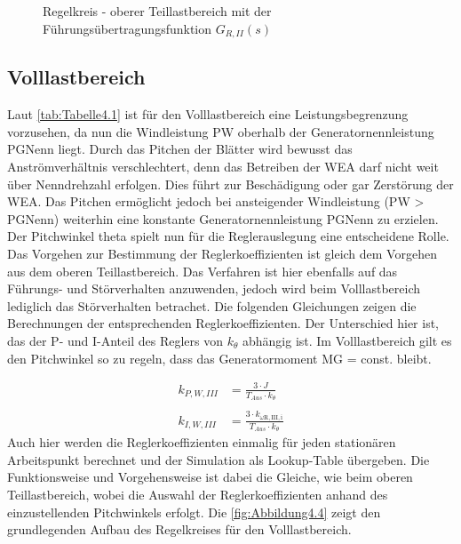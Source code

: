  \begin{figure}[H]
    \centering
    \caption[Reglerkreis - oberer Teillastbereich]{Regelkreis - oberer Teillastbereich mit der Führungsübertragungsfunktion $G_{R,II}(s)$ \cite{SkriptSchulte}}
    \label{fig:Abbildung4.3}
\end{figure}

\subsection{Volllastbereich}
Laut \autoref{tab:Tabelle4.1} ist für den Volllastbereich eine Leistungsbegrenzung vorzusehen, da nun die Windleistung \acs{PW} oberhalb der Generatornennleistung \acs{PGNenn} liegt. Durch das Pitchen der Blätter wird bewusst das Anströmverhältnis verschlechtert, denn das Betreiben der WEA darf nicht weit über Nenndrehzahl erfolgen. Dies führt zur Beschädigung oder gar Zerstörung der WEA. Das Pitchen ermöglicht jedoch bei ansteigender Windleistung (\acs{PW} > \acs{PGNenn}) weiterhin eine konstante Generatornennleistung \acs{PGNenn} zu erzielen. Der Pitchwinkel \acs{theta} spielt nun für die Reglerauslegung eine entscheidene Rolle.\\
Das Vorgehen zur Bestimmung der Reglerkoeffizienten ist gleich dem Vorgehen aus dem oberen Teillastbereich. Das Verfahren ist hier ebenfalls auf das Führungs- und Störverhalten anzuwenden, jedoch wird beim Volllastbereich lediglich das Störverhalten betrachet. Die folgenden Gleichungen zeigen die Berechnungen der entsprechenden Reglerkoeffizienten. Der Unterschied hier ist, das der P- und I-Anteil des Reglers von $k_\theta$ abhängig ist. Im Volllastbereich gilt es den Pitchwinkel so zu regeln, dass das Generatormoment \acs{MG} = const. bleibt.

\begin{align}
    k_{P,W,III} &= \frac{3 \cdot J}{T_{Aus} \cdot k_\theta}   \label{eq:Gleichung4.13}\\
    \nonumber\\
    k_{I,W,III} &= \frac{3 \cdot k_{\omega\mathrm{R,III,i}}}{T_{Aus} \cdot k_\theta}\label{eq:Gleichung4.14}
\end{align}
\newline
Auch hier werden die Reglerkoeffizienten einmalig für jeden stationären Arbeitspunkt berechnet und der Simulation als Lookup-Table übergeben. Die Funktionsweise und Vorgehensweise ist dabei die Gleiche, wie beim oberen Teillastbereich, wobei die Auswahl der Reglerkoeffizienten anhand des einzustellenden Pitchwinkels erfolgt. Die \autoref{fig:Abbildung4.4} zeigt den grundlegenden Aufbau des Regelkreises für den Volllastbereich.


